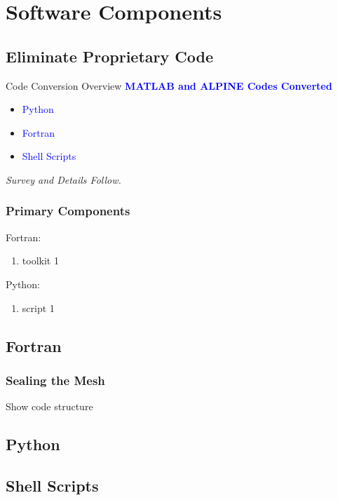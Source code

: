 % 

\section{Software Components}

\subsection{Eliminate Proprietary Code}
\begin{frame}{Code Conversion Overview}
    \centering
    \textcolor{blue}{\textbf{MATLAB and ALPINE Codes Converted}} \\[1em]

    \begin{itemize}
        \item \textcolor{blue}{Python} \\
        \item \textcolor{blue}{Fortran} \\
        \item \textcolor{blue}{Shell Scripts}
    \end{itemize}

    \vspace{1em}
    \textit{Survey and Details Follow.}
\end{frame}
\begin{frame}\frametitle{Primary Components}
Fortran:
\begin{enumerate}
	\item toolkit 1
\end{enumerate}

Python:
\begin{enumerate}
	\item script 1
\end{enumerate}

\end{frame}

\subsection{Fortran}
\begin{frame}\frametitle{Sealing the Mesh}
Show code structure
\end{frame}


\subsection{Python}
	
\subsection{Shell Scripts}

\endinput  %
